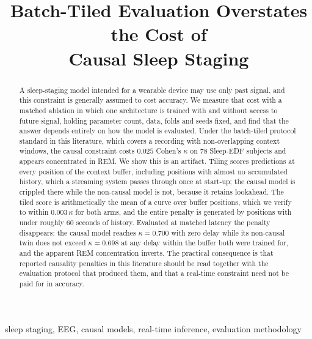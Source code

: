 \documentclass[conference]{IEEEtran}
\begin{document}
\title{Batch-Tiled Evaluation Overstates the Cost of\\Causal Sleep Staging}

\author{
}

\maketitle

\begin{abstract}
A sleep-staging model intended for a wearable device may use only past signal, and this
constraint is generally assumed to cost accuracy. We measure that cost with a matched
ablation in which one architecture is trained with and without access to future signal,
holding parameter count, data, folds and seeds fixed, and find that the answer depends
entirely on how the model is evaluated. Under the batch-tiled protocol standard in this
literature, which covers a recording with non-overlapping context windows, the causal
constraint costs $0.025$ Cohen's $\kappa$ on 78 Sleep-EDF subjects and appears concentrated
in REM. We show this is an artifact. Tiling scores predictions at every position of the
context buffer, including positions with almost no accumulated history, which a streaming
system passes through once at start-up; the causal model is crippled there while the
non-causal model is not, because it retains lookahead. The tiled score is arithmetically the
mean of a curve over buffer positions, which we verify to within $0.003\,\kappa$ for both
arms, and the entire penalty is generated by positions with under roughly 60 seconds of
history. Evaluated at matched latency the penalty disappears: the causal model reaches
$\kappa = 0.700$ with zero delay while its non-causal twin does not exceed $\kappa = 0.698$
at any delay within the buffer both were trained for, and the apparent REM concentration
inverts. The practical consequence is that reported causality penalties in this literature
should be read together with the evaluation protocol that produced them, and that a
real-time constraint need not be paid for in accuracy.
\end{abstract}

\begin{IEEEkeywords}
sleep staging, EEG, causal models, real-time inference, evaluation methodology
\end{IEEEkeywords}
\end{document}
